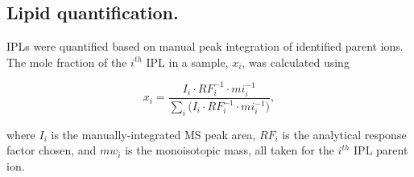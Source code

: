 \subsection{Lipid quantification.} IPLs were quantified based on manual peak integration of identified parent ions. The mole fraction of the $i^{th}$ IPL in a sample, $x_{i}$, was calculated using

\begin{equation} \label{eq:IPLquant}
x_{i} = \frac{I_{i} \cdot RF_{i}^{-1} \cdot mi_{i}^{-1}}{\sum_{i} \big(I_{i} \cdot RF_{i}^{-1} \cdot mi_{i}^{-1}\big)},
\end{equation}
 
\noindent where $I_{i}$ is the manually-integrated MS peak area, $RF_{i}$ is the analytical response factor chosen, and $mw_{i}$ is the monoisotopic mass, all taken for the $i^{th}$ IPL parent ion.

